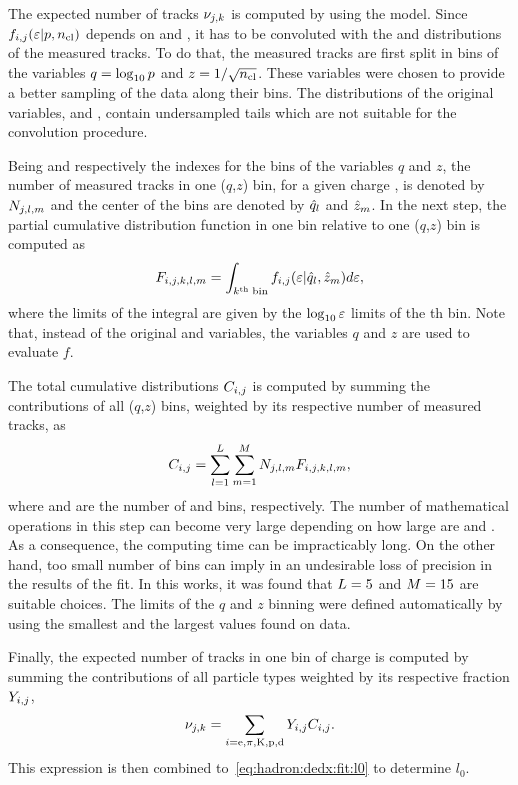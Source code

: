 The expected number of tracks $\nu_{j,k}$ is computed by using
the \eps model. Since $f_{i,j}(\mbox{$\varepsilon$}|p,\mbox{$n_{\text{cl}}$})$ depends on \pp and \ncl,
it has to be convoluted with the \pp and \ncl distributions
of the measured tracks.
To do that, the measured tracks are first split in
bins of the variables $q = \log_{10} p$ and $z = 1/\sqrt{\mbox{$n_{\text{cl}}$}}$.
These variables were chosen to provide a better sampling
of the data along their bins. The distributions of the
original variables, \pp and \ncl, contain undersampled
tails which are not suitable for the convolution procedure.

Being \iq and \iz respectively the indexes for the
bins of the variables $q$ and $z$, the
number of measured tracks in one ($q$,$z$) bin,
for a given charge \ich, is denoted
by $N_{j,l,m}$ and the center of the bins are denoted
by $\hat{q}_{l}$ and $\hat{z}_{m}$. In the next step, the partial
cumulative distribution function in one \ieps bin relative to
one ($q$,$z$) bin is computed as
\begin{equation}
  F_{i,j,k,l,m} = \int_{k^\text{th}\; \text{bin}} f_{i,j}(\mbox{$\varepsilon$}|\hat{q}_{l},\hat{z}_{m}) d\mbox{$\varepsilon$},
\end{equation}
where the limits of the integral are given by the $\log_{10}\mbox{$\varepsilon$}$
limits of the {\ieps}th bin. Note that,
instead of the original \pp and \ncl variables,
the variables $q$ and $z$ are used to evaluate $f$.

The total cumulative distributions $C_{i,j}$ is computed by summing
the contributions of all ($q$,$z$) bins, weighted by its respective
number of measured tracks, as
\begin{equation}
  C_{i,j} = \sum_{l=1}^{L} \sum_{m=1}^{M} N_{j,l,m} F_{i,j,k,l,m},
\end{equation}
where \nq and \nz are the number of \iq and \iz bins, respectively.
The number of mathematical operations in this step
can become very large depending on how large are \nq and \nz.
As a consequence, the computing time can be impracticably long.
On the other hand,
too small number of bins can imply in an undesirable loss of precision
in the results of the fit. In this works,
it was found that $L = 5$ and $M = 15$ are suitable choices.
The limits of the $q$ and $z$ binning were defined automatically
by using the smallest and the largest values found on data.

Finally, the expected number of tracks in one \ieps bin of charge \ich
is computed by summing the contributions of all particle types
weighted by its respective fraction $Y_{i,j}$,
\begin{equation}
  \nu_{j,k} = \sum_{i=\text{e},\pi,\text{K},\text{p},\text{d}} Y_{i,j} C_{i,j}.
  \label{eq:hadron:dedx:fit:exp}
\end{equation}
This expression is then combined to~\cref{eq:hadron:dedx:fit:l0}
to determine $l_0$.

